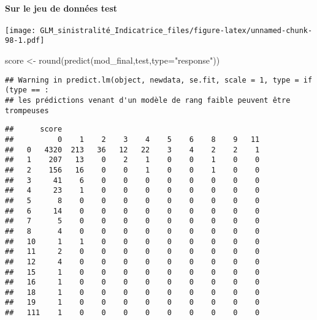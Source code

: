 \documentclass[
]{article}
\newenvironment{Shaded}{\begin{snugshade}}{\end{snugshade}}
\newcommand{\AttributeTok}[1]{\textcolor[rgb]{0.77,0.63,0.00}{#1}}
\newcommand{\FunctionTok}[1]{\textcolor[rgb]{0.00,0.00,0.00}{#1}}
\newcommand{\NormalTok}[1]{#1}
\newcommand{\OtherTok}[1]{\textcolor[rgb]{0.56,0.35,0.01}{#1}}
\newcommand{\SpecialCharTok}[1]{\textcolor[rgb]{0.00,0.00,0.00}{#1}}
\newcommand{\StringTok}[1]{\textcolor[rgb]{0.31,0.60,0.02}{#1}}
\begin{document}
\hypertarget{sur-le-jeu-de-donnuxe9es-test-2}{%
\paragraph{Sur le jeu de données
test}\label{sur-le-jeu-de-donnuxe9es-test-2}}

\begin{Shaded}
\end{Shaded}

\texttt{[image: GLM\_sinistralité\_Indicatrice\_files/figure-latex/unnamed-chunk-98-1.pdf]}

\begin{Shaded}
\begin{Highlighting}[]
\NormalTok{score }\OtherTok{\textless{}{-}} \FunctionTok{round}\NormalTok{(}\FunctionTok{predict}\NormalTok{(mod\_final,test,}\AttributeTok{type=}\StringTok{"response"}\NormalTok{))}
\end{Highlighting}
\end{Shaded}

\begin{verbatim}
## Warning in predict.lm(object, newdata, se.fit, scale = 1, type = if (type == :
## les prédictions venant d'un modèle de rang faible peuvent être trompeuses
\end{verbatim}

\begin{Shaded}
\end{Shaded}

\begin{verbatim}
##      score
##          0    1    2    3    4    5    6    8    9   11
##   0   4320  213   36   12   22    3    4    2    2    1
##   1    207   13    0    2    1    0    0    1    0    0
##   2    156   16    0    0    1    0    0    1    0    0
##   3     41    6    0    0    0    0    0    0    0    0
##   4     23    1    0    0    0    0    0    0    0    0
##   5      8    0    0    0    0    0    0    0    0    0
##   6     14    0    0    0    0    0    0    0    0    0
##   7      5    0    0    0    0    0    0    0    0    0
##   8      4    0    0    0    0    0    0    0    0    0
##   10     1    1    0    0    0    0    0    0    0    0
##   11     2    0    0    0    0    0    0    0    0    0
##   12     4    0    0    0    0    0    0    0    0    0
##   15     1    0    0    0    0    0    0    0    0    0
##   16     1    0    0    0    0    0    0    0    0    0
##   18     1    0    0    0    0    0    0    0    0    0
##   19     1    0    0    0    0    0    0    0    0    0
##   111    1    0    0    0    0    0    0    0    0    0
\end{verbatim}
\end{document}
